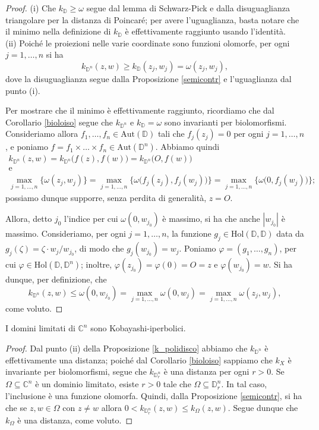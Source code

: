 \begin{proof}
    (i) Che $k_{\mathbb{D}}\ge\omega$ segue dal lemma di Schwarz-Pick e dalla disuguaglianza triangolare per la distanza di Poincaré; per avere l'uguaglianza, basta notare che il minimo nella definizione di $k_{\mathbb{D}}$ è effettivamente raggiunto usando l'identità.\\

    (ii) Poiché le proiezioni nelle varie coordinate sono funzioni olomorfe, per ogni $j=1,\dots, n$ si ha
    $$k_{\mathbb{D}^n}(z,w) \ge k_{\mathbb{D}}(z_j,w_j)=\omega(z_j,w_j),$$
    dove la disuguaglianza segue dalla Proposizione \ref{semicontr} e l'uguaglianza dal punto (i).

    Per mostrare che il minimo è effettivamente raggiunto, ricordiamo che dal Corollario \ref{bioloiso} segue che $k_{\mathbb{D}^n}$ e $k_{\mathbb{D}}=\omega$ sono invarianti per biolomorfismi. Consideriamo allora $f_1,\dots, f_n \in \text{Aut}(\mathbb{D})$ tali che $f_j(z_j)=0$ per ogni $j=1,\dots,n$, e poniamo $f=f_1\times\dots\times f_n\in\text{Aut}(\mathbb{D}^n)$. Abbiamo quindi
    \begin{gather*}
        k_{\mathbb{D}^n}(z,w)=k_{\mathbb{D}^n}\big(f(z),f(w)\big)=k_{\mathbb{D}^n}\big(O,f(w)\big)\\
        \text{e}\\
        \max_{j=1,\dots,n}\{\omega(z_j,w_j)\}=\max_{j=1,\dots,n}\big\{\omega\big(f_j(z_j),f_j(w_j)\big)\big\}=\max_{j=1,\dots,n}\big\{\omega\big(0,f_j(w_j)\big)\big\};
    \end{gather*}
    possiamo dunque supporre, senza perdita di generalità, $z=O$.
    
    Allora, detto $j_0$ l'indice per cui $\omega(0,w_{j_0})$ è massimo, si ha che anche $|w_{j_0}|$ è massimo. Consideriamo, per ogni $j=1,\dots,n$, la funzione $g_j \in\text{Hol}(\mathbb{D},\mathbb{D})$ data da $g_j(\zeta)=\zeta\cdot w_j/w_{j_0}$, di modo che $g_j(w_{j_0})=w_j$. Poniamo $\varphi=(g_1,\dots,g_n)$, per cui $\varphi\in\text{Hol}(\mathbb{D},\mathbb{D}^n)$; inoltre, $\varphi(z_{j_0})=\varphi(0)=O=z$ e $\varphi(w_{j_0})=w$. Si ha dunque, per definizione, che
    $$k_{\mathbb{D}^n}(z,w) \le \omega(0,w_{j_0})=\max_{j=1,\dots,n}\omega(0,w_j)=\max_{j=1,\dots,n}\omega(z_j,w_j),$$
    come voluto.
\end{proof}

\begin{cor}
    I domini limitati di $\mathbb{C}^n$ sono Kobayashi-iperbolici.
\end{cor}
\begin{proof}
    Dal punto (ii) della Proposizione \ref{k_polidisco} abbiamo che $k_{\mathbb{D}^n}$ è effettivamente una distanza; poiché dal Corollario \ref{bioloiso} sappiamo che $k_X$ è invariante per biolomorfismi, segue che $k_{\mathbb{D}_r^n}$ è una distanza per ogni $r>0$. Se $\Omega\subseteq\mathbb{C}^n$ è un dominio limitato, esiste $r>0$ tale che $\Omega\subseteq\mathbb{D}_r^n$. In tal caso, l'inclusione è una funzione olomorfa. Quindi, dalla Proposizione \ref{semicontr}, si ha che se $z,w \in \Omega$ con $z\not=w$ allora $0<k_{\mathbb{D}_r^n}(z,w) \le k_{\Omega}(z,w)$. Segue dunque che $k_\Omega$ è una distanza, come voluto.
\end{proof}

